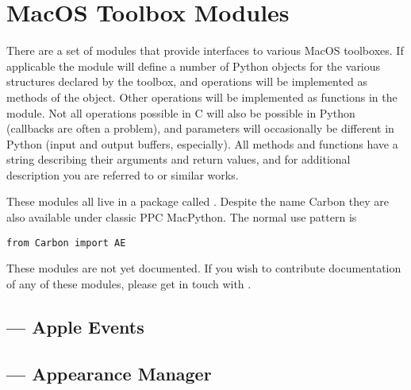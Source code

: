 \chapter{MacOS Toolbox Modules \label{toolbox}}

There are a set of modules that provide interfaces to various MacOS
toolboxes.  If applicable the module will define a number of Python
objects for the various structures declared by the toolbox, and
operations will be implemented as methods of the object.  Other
operations will be implemented as functions in the module.  Not all
operations possible in C will also be possible in Python (callbacks
are often a problem), and parameters will occasionally be different in
Python (input and output buffers, especially).  All methods and
functions have a  string describing their arguments
and return values, and for additional description you are referred to
 or similar works.

These modules all live in a package called . Despite the
name Carbon they are also available under classic PPC MacPython.
The normal use pattern is

\begin{verbatim}
from Carbon import AE
\end{verbatim}

  These modules are not yet documented.  If you
wish to contribute documentation of any of these modules, please get
in touch with .

\localmoduletable




\section{ --- Apple Events}


\section{ --- Appearance Manager}


